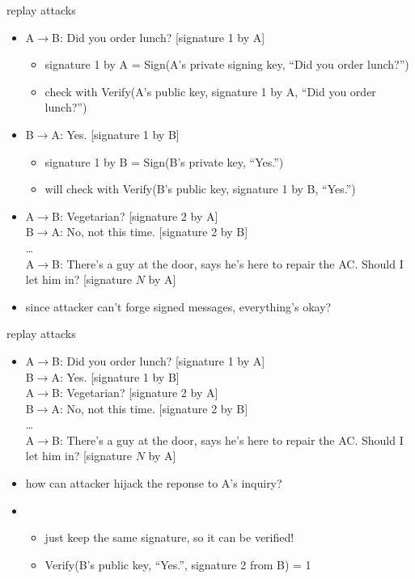 \begin{frame}{replay attacks}
    \begin{itemize}
    \item A$\rightarrow$B: Did you order lunch? [signature 1 by A]
        \begin{itemize}
            \item signature 1 by A = Sign(A's private signing key, ``Did you order lunch?'')
            \item check with Verify(A's public key, signature 1 by A, ``Did you order lunch?'')
        \end{itemize}
    \item B$\rightarrow$A: Yes. [signature 1 by B]
        \begin{itemize}
            \item signature 1 by B = Sign(B's private key, ``Yes.'')
            \item will check with Verify(B's public key, signature 1 by B, ``Yes.'')
        \end{itemize}
    \item  A$\rightarrow$B: Vegetarian? [signature 2 by A]  \\
     B$\rightarrow$A: No, not this time. [signature 2 by B]  \\ \ldots \\
     A$\rightarrow$B: There's a guy at the door, says he's here to repair the AC. Should I let him in? [signature $N$ by A]
    \vspace{.5cm}
    \item since attacker can't forge signed messages, everything's okay?
    \end{itemize}
\end{frame}

\begin{frame}{replay attacks}
    \begin{itemize}
    \item A$\rightarrow$B: Did you order lunch? [signature 1 by A] \\
          B$\rightarrow$A: Yes. [signature 1 by B]  \\
          A$\rightarrow$B: Vegetarian? [signature 2 by A] \\
          B$\rightarrow$A: No, not this time. [signature 2 by B] \\
          \ldots \\
          A$\rightarrow$B: There's a guy at the door, says he's here to repair the AC. Should I let him in? [signature $N$ by A]
    \vspace{.5cm}
    \item how can attacker hijack the reponse to A's inquiry?
    \item<2-> 
        \begin{itemize}
        \item just keep the same signature, so it can be verified!
        \item Verify(B's public key, ``Yes.'', signature 2 from B) = 1
        \end{itemize}
    \end{itemize}
\end{frame}


